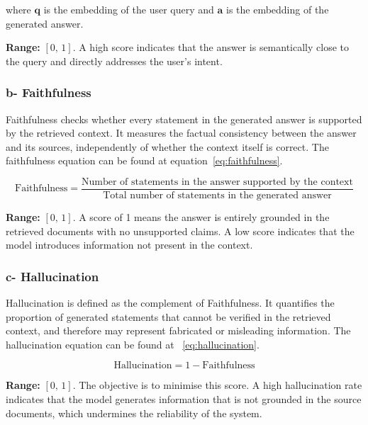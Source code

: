 where $\mathbf{q}$ is the embedding of the user query and $\mathbf{a}$
is the embedding of the generated answer.

\textbf{Range:} $[0,\,1]$. A high score indicates that the answer is
semantically close to the query and directly addresses the user's intent.


\subsubsection{b- Faithfulness}

Faithfulness checks whether every statement in the generated answer is
supported by the retrieved context. It measures the factual consistency
between the answer and its sources, independently of whether the
context itself is correct.
The faithfulness equation can be found at equation~\ref{eq:faithfulness}.

\begin{equation}
\text{Faithfulness} =
\frac{\text{Number of statements in the answer supported by the context}}
     {\text{Total number of statements in the generated answer}}
\label{eq:faithfulness}
\end{equation}

\textbf{Range:} $[0,\,1]$. A score of 1 means the answer is entirely
grounded in the retrieved documents with no unsupported claims.
A low score indicates that the model introduces information not present
in the context.


\subsubsection{c- Hallucination}

Hallucination is defined as the complement of Faithfulness. It quantifies
the proportion of generated statements that cannot be verified in the
retrieved context, and therefore may represent fabricated or misleading
information. The hallucination equation can be found at
~\ref{eq:hallucination}.

\begin{equation}
\text{Hallucination} = 1 - \text{Faithfulness}
\label{eq:hallucination}
\end{equation}

\textbf{Range:} $[0,\,1]$. The objective is to minimise this score.
A high hallucination rate indicates that the model generates information
that is not grounded in the source documents, which undermines the
reliability of the system.


